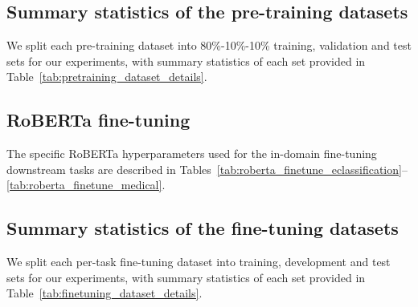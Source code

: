 

\subsection{Summary statistics of the pre-training datasets}
\label{asec:pretraining_dataset_details}

We split each pre-training dataset into 80\%-10\%-10\% training, validation and test sets for our experiments, with summary statistics of each set provided in Table~\ref{tab:pretraining_dataset_details}.




\newpage
\subsection{RoBERTa fine-tuning}
\label{asec:implementation_details_roberta_fine-tune}

The specific RoBERTa hyperparameters used for the in-domain fine-tuning downstream tasks are described in Tables~\ref{tab:roberta_finetune_eclassification}--\ref{tab:roberta_finetune_medical}.






\clearpage
\subsection{Summary statistics of the fine-tuning datasets}
\label{asec:finetuning_dataset_details}

We split each per-task fine-tuning dataset into training, development and test sets for our experiments, with summary statistics of each set provided in Table~\ref{tab:finetuning_dataset_details}.


